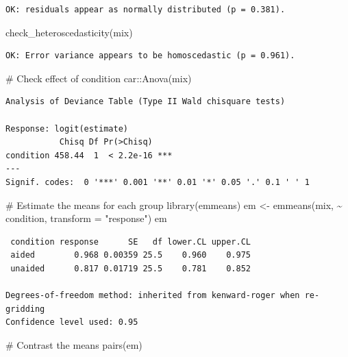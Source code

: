 \documentclass[
  letterpaper,
  DIV=11,
  numbers=noendperiod]{scrreprt}
\newenvironment{Shaded}{\begin{snugshade}}{\end{snugshade}}
\newcommand{\AttributeTok}[1]{\textcolor[rgb]{0.40,0.45,0.13}{#1}}
\newcommand{\CommentTok}[1]{\textcolor[rgb]{0.37,0.37,0.37}{#1}}
\newcommand{\FunctionTok}[1]{\textcolor[rgb]{0.28,0.35,0.67}{#1}}
\newcommand{\NormalTok}[1]{\textcolor[rgb]{0.00,0.23,0.31}{#1}}
\newcommand{\OtherTok}[1]{\textcolor[rgb]{0.00,0.23,0.31}{#1}}
\newcommand{\SpecialCharTok}[1]{\textcolor[rgb]{0.37,0.37,0.37}{#1}}
\newcommand{\StringTok}[1]{\textcolor[rgb]{0.13,0.47,0.30}{#1}}
\begin{document}
\begin{verbatim}
OK: residuals appear as normally distributed (p = 0.381).
\end{verbatim}

\begin{Shaded}
\begin{Highlighting}[]
\FunctionTok{check\_heteroscedasticity}\NormalTok{(mix)}
\end{Highlighting}
\end{Shaded}

\begin{verbatim}
OK: Error variance appears to be homoscedastic (p = 0.961).
\end{verbatim}

\begin{Shaded}
\begin{Highlighting}[]
\CommentTok{\# Check effect of condition}
\NormalTok{car}\SpecialCharTok{::}\FunctionTok{Anova}\NormalTok{(mix)}
\end{Highlighting}
\end{Shaded}

\begin{verbatim}
Analysis of Deviance Table (Type II Wald chisquare tests)

Response: logit(estimate)
           Chisq Df Pr(>Chisq)    
condition 458.44  1  < 2.2e-16 ***
---
Signif. codes:  0 '***' 0.001 '**' 0.01 '*' 0.05 '.' 0.1 ' ' 1
\end{verbatim}

\begin{Shaded}
\begin{Highlighting}[]
\CommentTok{\# Estimate the means for each group}
\FunctionTok{library}\NormalTok{(emmeans)}
\NormalTok{em }\OtherTok{\textless{}{-}} \FunctionTok{emmeans}\NormalTok{(mix, }\SpecialCharTok{\textasciitilde{}}\NormalTok{ condition, }\AttributeTok{transform =} \StringTok{"response"}\NormalTok{)}
\NormalTok{em}
\end{Highlighting}
\end{Shaded}

\begin{verbatim}
 condition response      SE   df lower.CL upper.CL
 aided        0.968 0.00359 25.5    0.960    0.975
 unaided      0.817 0.01719 25.5    0.781    0.852

Degrees-of-freedom method: inherited from kenward-roger when re-gridding 
Confidence level used: 0.95 
\end{verbatim}

\begin{Shaded}
\begin{Highlighting}[]
\CommentTok{\# Contrast the means}
\FunctionTok{pairs}\NormalTok{(em)}
\end{Highlighting}
\end{Shaded}
\end{document}
